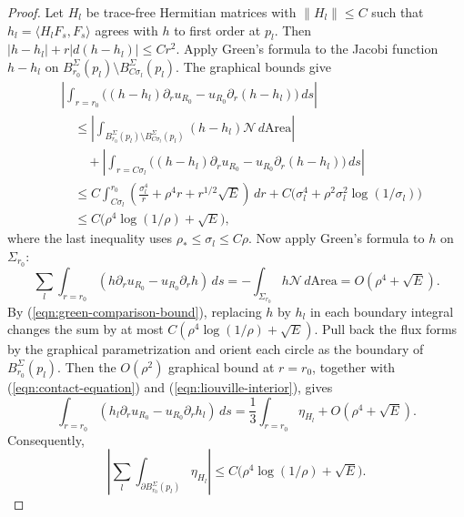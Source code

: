 \documentclass[11pt,a4paper]{article}
\numberwithin{equation}{section}
\theoremstyle{definition}
\theoremstyle{remark}
\begin{document}
\begin{proof}
		Let $H_l$ be trace-free Hermitian matrices with $\|H_l\|\le C$ such that
		$h_l=\langle H_lF_s,F_s\rangle$ agrees with $h$ to first order at $p_l$.
		Then
		$|h-h_l|+r|d(h-h_l)|\le Cr^2$.
		Apply Green's formula to the Jacobi function $h-h_l$ on
		$B_{r_0}^{\Sigma}(p_l)\setminus B_{C\sigma_l}^{\Sigma}(p_l)$.
		The graphical bounds give
		\begin{equation}\label{eqn:green-comparison-bound}
			\begin{aligned}
				&\left|\int_{r=r_0}
				\bigl((h-h_l)\partial_r u_{R_0}-u_{R_0}\partial_r(h-h_l)\bigr)\,ds\right|\\
				&\quad\le\left|\int_{B_{r_0}^{\Sigma}(p_l)\setminus B_{C\sigma_l}^{\Sigma}(p_l)}
				(h-h_l)\mathcal N\,d\mathrm{Area}\right|\\
				&\qquad+\left|\int_{r=C\sigma_l}
				\bigl((h-h_l)\partial_r u_{R_0}-u_{R_0}\partial_r(h-h_l)\bigr)\,ds\right|\\
				&\quad\le C\int_{C\sigma_l}^{r_0}
				\left(\frac{\sigma_l^4}{r}+\rho^4r+r^{1/2}\sqrt E\right)\,dr
				+C\bigl(\sigma_l^4+\rho^2\sigma_l^2\log(1/\sigma_l)\bigr)\\
				&\quad\le C\bigl(\rho^4\log(1/\rho)+\sqrt E\bigr),
			\end{aligned}
		\end{equation}
		where the last inequality uses $\rho_*\le\sigma_l\le C\rho$.
		Now apply Green's formula to $h$ on $\Sigma_{r_0}$:
		\[
		\sum_l\int_{r=r_0}(h\partial_r u_{R_0}-u_{R_0}\partial_r h)\,ds
		=-\int_{\Sigma_{r_0}}h\mathcal N\,d\mathrm{Area}
		=O(\rho^4+\sqrt E).
		\]
		By (\ref{eqn:green-comparison-bound}), replacing $h$ by $h_l$ in each boundary
		integral changes the sum by at most $C(\rho^4\log(1/\rho)+\sqrt E)$.
		Pull back the flux forms by the graphical parametrization and orient
		each circle as the boundary of $B_{r_0}^{\Sigma}(p_l)$.
		Then the $O(\rho^2)$ graphical bound at $r=r_0$, together with
		(\ref{eqn:contact-equation}) and (\ref{eqn:liouville-interior}), gives
		\[
		\int_{r=r_0}(h_l\partial_r u_{R_0}-u_{R_0}\partial_r h_l)\,ds
		=\frac13\int_{r=r_0}\eta_{H_l}+O(\rho^4+\sqrt E).
		\]
		Consequently,
		\begin{equation}\label{eqn:green-flux-bound}
			\left|\sum_l\int_{\partial B_{r_0}^{\Sigma}(p_l)}\eta_{H_l}\right|
			\le C\bigl(\rho^4\log(1/\rho)+\sqrt E\bigr).
		\end{equation}
		

\end{proof}
\end{document}
